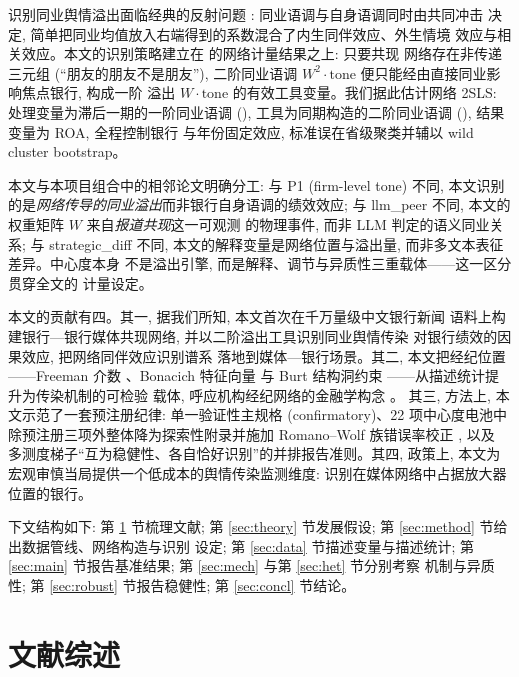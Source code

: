 识别同业舆情溢出面临经典的反射问题
\parencite{manski1993reflection}: 同业语调与自身语调同时由共同冲击
决定, 简单把同业均值放入右端得到的系数混合了内生同伴效应、外生情境
效应与相关效应。本文的识别策略建立在
\textcite{bramoulle2009identification} 的网络计量结果之上: 只要共现
网络存在非传递三元组 (``朋友的朋友不是朋友''), 二阶同业语调
$W^{2}\cdot\text{tone}$ 便只能经由直接同业影响焦点银行, 构成一阶
溢出 $W\cdot\text{tone}$ 的有效工具变量。我们据此估计网络 2SLS:
处理变量为滞后一期的一阶同业语调 (),
工具为同期构造的二阶同业语调
(), 结果变量为 ROA, 全程控制银行
与年份固定效应, 标准误在省级聚类并辅以 wild cluster bootstrap。

本文与本项目组合中的相邻论文明确分工: 与 P1 (firm-level tone) 不同,
本文识别的是\emph{网络传导的同业溢出}而非银行自身语调的绩效效应;
与 llm\_peer 不同, 本文的权重矩阵 $W$ 来自\emph{报道共现}这一可观测
的物理事件, 而非 LLM 判定的语义同业关系; 与 strategic\_diff 不同,
本文的解释变量是网络位置与溢出量, 而非多文本表征差异。中心度本身
不是溢出引擎, 而是解释、调节与异质性三重载体——这一区分贯穿全文的
计量设定。

本文的贡献有四。其一, 据我们所知, 本文首次在千万量级中文银行新闻
语料上构建银行—银行媒体共现网络, 并以二阶溢出工具识别同业舆情传染
对银行绩效的因果效应, 把网络同伴效应识别谱系
\parencite{bramoulle2009identification,bramoulle2020peer,boucher2024general}
落地到媒体—银行场景。其二, 本文把经纪位置——Freeman 介数
\parencite{freeman1978centrality}、Bonacich 特征向量
\parencite{bonacich1972factoring} 与 Burt 结构洞约束
\parencite{burt1992structural}——从描述统计提升为传染机制的可检验
载体, 呼应机构经纪网络的金融学构念 \parencite{han2024brokerage}。
其三, 方法上, 本文示范了一套预注册纪律: 单一验证性主规格
(confirmatory)、22 项中心度电池中除预注册三项外整体降为探索性附录并施加
Romano--Wolf 族错误率校正 \parencite{romano2005stepwise}, 以及
多测度梯子``互为稳健性、各自恰好识别''的并排报告准则。其四,
政策上, 本文为宏观审慎当局提供一个低成本的舆情传染监测维度:
识别在媒体网络中占据放大器位置的银行。

下文结构如下: 第 \ref{sec:lit} 节梳理文献; 第 \ref{sec:theory}
节发展假设; 第 \ref{sec:method} 节给出数据管线、网络构造与识别
设定; 第 \ref{sec:data} 节描述变量与描述统计; 第 \ref{sec:main}
节报告基准结果; 第 \ref{sec:mech} 与第 \ref{sec:het} 节分别考察
机制与异质性; 第 \ref{sec:robust} 节报告稳健性; 第 \ref{sec:concl}
节结论。

\section{文献综述}\label{sec:lit}

